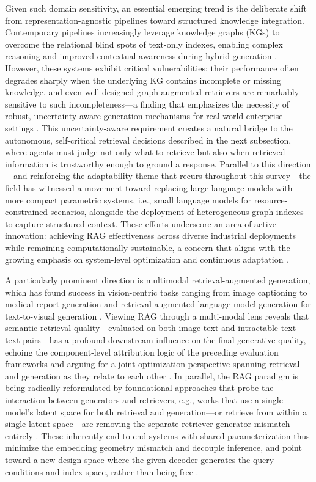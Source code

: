 \documentclass[11pt,a4paper]{article}
\begin{document}
Given such domain sensitivity, an essential emerging trend is the deliberate shift from representation-agnostic pipelines toward structured knowledge integration. Contemporary pipelines increasingly leverage knowledge graphs (KGs) to overcome the relational blind spots of text-only indexes, enabling complex reasoning and improved contextual awareness during hybrid generation \cite{arxiv:2503.10677v3}. However, these systems exhibit critical vulnerabilities: their performance often degrades sharply when the underlying KG contains incomplete or missing knowledge, and even well-designed graph-augmented retrievers are remarkably sensitive to such incompleteness---a finding that emphasizes the necessity of robust, uncertainty-aware generation mechanisms for real-world enterprise settings \cite{arxiv:2508.06401v3}. This uncertainty-aware requirement creates a natural bridge to the autonomous, self-critical retrieval decisions described in the next subsection, where agents must judge not only what to retrieve but also when retrieved information is trustworthy enough to ground a response. Parallel to this direction---and reinforcing the adaptability theme that recurs throughout this survey---the field has witnessed a movement toward replacing large language models with more compact parametric systems, i.e., small language models for resource-constrained scenarios, alongside the deployment of heterogeneous graph indexes to capture structured context. These efforts underscore an area of active innovation: achieving RAG effectiveness across diverse industrial deployments while remaining computationally sustainable, a concern that aligns with the growing emphasis on system-level optimization and continuous adaptation \cite{arxiv:2503.14649v2}.

A particularly prominent direction is multimodal retrieval-augmented generation, which has found success in vision-centric tasks ranging from image captioning to medical report generation \cite{arxiv:2503.18016v1} and retrieval-augmented language model generation for text-to-visual generation \cite{arxiv:2504.08748v1}. Viewing RAG through a multi-modal lens reveals that semantic retrieval quality---evaluated on both image-text and intractable text-text pairs---has a profound downstream influence on the final generative quality, echoing the component-level attribution logic of the preceding evaluation frameworks and arguing for a joint optimization perspective spanning retrieval and generation as they relate to each other \cite{arxiv:2504.08748v1}. In parallel, the RAG paradigm is being radically reformulated by foundational approaches that probe the interaction between generators and retrievers, e.g., works that use a single model's latent space for both retrieval and generation---or retrieve from within a single latent space---are removing the separate retriever-generator mismatch entirely \cite{arxiv:2604.17866v2}. These inherently end-to-end systems with shared parameterization thus minimize the embedding geometry mismatch and decouple inference, and point toward a new design space where the given decoder generates the query conditions and index space, rather than being free \cite{arxiv:2506.02279v2}.
\end{document}
